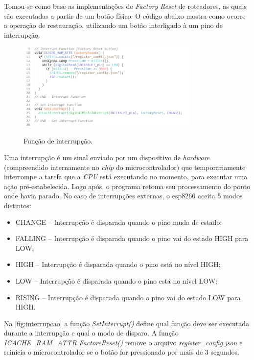 Tomou-se como base as implementações de \textit{Factory Reset} de roteadores, as quais são executadas a partir de um botão físico. O código abaixo mostra como ocorre a operação de restauração, utilizando um botão interligado à um pino de interrupção.

\begin{figure}[H]
	\centering
	\caption{Função de interrupção.}
	\includegraphics[width=0.8\textwidth]{figuras/interrupcao.png}
	\label{fig:interrupcao}
\end{figure}


Uma interrupção é um sinal enviado por um dispositivo de \textit{hardware} (compreendido internamente no \textit{chip} do microcontrolador) que temporariamente interrompe a tarefa que a \textit{CPU} está executando no momento, para executar uma ação pré-estabelecida. Logo após, o programa retoma seu processamento do ponto onde havia parado. No caso de interrupções externas, o esp8266 aceita 5 modos distintos:

\begin{itemize}
	\item CHANGE – Interrupção é disparada quando o pino muda de estado;
	\item FALLING – Interrupção é disparada quando o pino vai do estado HIGH para LOW;
	\item HIGH – Interrupção é disparada quando o pino está no nível HIGH;
	\item LOW – Interrupção é disparada quando o pino está no nível LOW;
	\item RISING – Interrupção é disparada quando o pino vai do estado LOW para HIGH.
\end{itemize}

Na \autoref{fig:interrupcao} a função \textit{SetInterrupt()} define qual função deve ser executada durante a interrupção e qual o modo de disparo. A função \textit{ICACHE\_RAM\_ATTR FactoreReset()} remove o arquivo \textit{register\_config.json} e reinicia o microcontrolador se o botão for pressionado por mais de 3 segundos.



